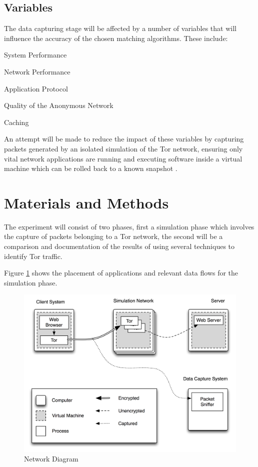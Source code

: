 \documentclass{conference}
\begin{document}
\subsection{Variables}

The data capturing stage will be affected by a number of variables that will influence the accuracy of the chosen matching algorithms. These include:

\begin{enumerate*}
\item System Performance
\item Network Performance
\item Application Protocol
\item Quality of the Anonymous Network
\item Caching
\end{enumerate*}

An attempt will be made to reduce the impact of these variables by capturing packets generated by an isolated simulation of the Tor network, ensuring only vital network applications are running and executing software inside a virtual machine which can be rolled back to a known snapshot \parencite{website:snapshot-definition}.

\section{Materials and Methods}

The experiment will consist of two phases, first a simulation phase which involves the capture of packets belonging to a Tor network, the second will be a comparison and documentation of the results of using several techniques to identify Tor traffic.

Figure \ref{network-diagram} shows the placement of applications and relevant data flows for the simulation phase.

\begin{figure}
\center \includegraphics[scale=0.7]{network-diagram}
\caption{Network Diagram}
\label{network-diagram}
\end{figure}

\printbibliography[title=REFERENCES]
\end{document}
